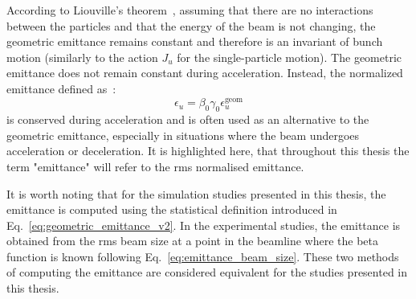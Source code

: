  
 
 According to Liouville’s theorem~\cite{wolski2014}, assuming that there are no interactions between the particles and that the energy of the beam is not changing, the geometric emittance remains constant and therefore is an invariant of bunch motion (similarly to the action $J_u$ for the single-particle motion). The geometric emittance does not remain constant during acceleration. Instead, the normalized emittance defined as~\cite{wolski2014}:
 \begin{equation}\label{eq:normalised_emittance}
     \epsilon_u = \beta_0 \gamma_0 \epsilon^{\mathrm{geom}}_u
 \end{equation}
is conserved during acceleration and is often used as an alternative to the geometric emittance, especially in situations where the beam undergoes acceleration or deceleration. It is highlighted here, that throughout this thesis the term "emittance" will refer to the rms normalised emittance.
 
 It is worth noting that for the simulation studies presented in this thesis, the emittance is computed using the statistical definition introduced in Eq.~\eqref{eq:geometric_emittance_v2}. In the experimental studies, the emittance is obtained from the rms beam size at a point in the beamline where the beta function is known following Eq.~\eqref{eq:emittance_beam_size}. These two methods of computing the emittance are considered equivalent for the studies presented in this thesis.
 
 
